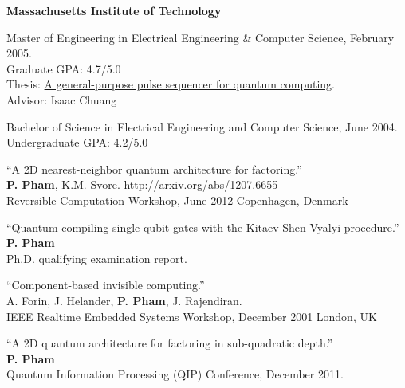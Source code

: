 \documentclass[letter]{article}
\begin{document}
{\bf Massachusetts Institute of Technology}
\par
Master of Engineering in Electrical Engineering \& Computer Science, February 2005.\\
Graduate GPA: 4.7/5.0\\
Thesis: \href{http://sourceforge.net/project/showfiles.php?group_id=129764&package_id=144780&release_id=307201}{A general-purpose pulse sequencer for quantum computing}.\\
Advisor: Isaac Chuang\\
\par
Bachelor of Science in Electrical Engineering and Computer Science, June 2004.\\
Undergraduate GPA: 4.2/5.0
\vspace{\baselineskip}
\par

\vspace{\baselineskip}
\par
``A 2D nearest-neighbor quantum architecture for factoring.''
\\
\textbf{P. Pham}, K.M. Svore. \hfill \url{http://arxiv.org/abs/1207.6655}\\
Reversible Computation Workshop, June 2012 \hfill Copenhagen, Denmark

\vspace{\baselineskip}
\par
``Quantum compiling single-qubit gates with the Kitaev-Shen-Vyalyi procedure.''\\
\textbf{P. Pham}\\
Ph.D. qualifying examination report.

\vspace{\baselineskip}
\par
``Component-based invisible computing.''\\
A. Forin, J. Helander, \textbf{P. Pham}, J. Rajendiran.\\
IEEE Realtime Embedded Systems Workshop, December 2001 \hfill London, UK

\vspace{\baselineskip}
\par
``A 2D quantum architecture for factoring in sub-quadratic depth.''
\\
\textbf{P. Pham}\\
Quantum Information Processing (QIP) Conference, December 2011.
\end{document}
